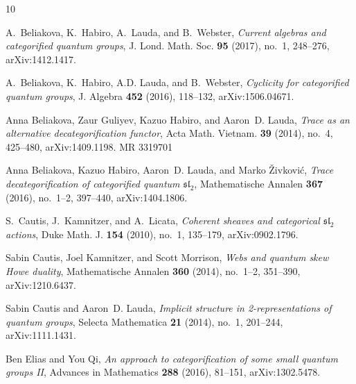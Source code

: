 \documentclass{amsart}
\numberwithin{equation}{section}
\theoremstyle{definition}
\begin{document}
\providecommand{\bysame}{\leavevmode\hbox to3em{\hrulefill}\thinspace}
\providecommand{\MR}{\relax\ifhmode\unskip\space\fi MR }
\providecommand{\MRhref}[2]{%
  \href{http://www.ams.org/mathscinet-getitem?mr=#1}{#2}
}
\providecommand{\href}[2]{#2}
\begin{thebibliography}{10}

A.~Beliakova, K.~Habiro, A.~Lauda, and B.~Webster, \emph{Current algebras and categorified quantum groups}, J. Lond. Math. Soc. \textbf{95} (2017), no.~1, 248--276, \href{https://arxiv.org/abs/1412.1417}{arXiv:1412.1417}.

A.~Beliakova, K.~Habiro, A.D. Lauda, and B.~Webster, \emph{Cyclicity for categorified quantum groups}, J. Algebra \textbf{452} (2016), 118--132, \href{http://arxiv.org/abs/arXiv:1506.04671}{arXiv:1506.04671}.

Anna Beliakova, Zaur Guliyev, Kazuo Habiro, and Aaron~D. Lauda, \emph{Trace as an alternative decategorification functor}, Acta Math. Vietnam. \textbf{39} (2014), no.~4, 425--480, \href{https://arxiv.org/abs/1409.1198}{arXiv:1409.1198}. \MR{3319701}

Anna Beliakova, Kazuo Habiro, Aaron~D. Lauda, and Marko Živković, \emph{Trace decategorification of categorified quantum {$\mathfrak {sl}_2$}}, Mathematische Annalen \textbf{367} (2016), no.~1–2, 397–440, \href{https://arxiv.org/abs/1404.1806}{arXiv:1404.1806}.

S.~Cautis, J.~Kamnitzer, and A.~Licata, \emph{Coherent sheaves and categorical {$\mathfrak{sl}_2$} actions}, Duke Math. J. \textbf{154} (2010), no.~1, 135--179, \href{https://arxiv.org/abs/0902.1796}{arXiv:0902.1796}.

Sabin Cautis, Joel Kamnitzer, and Scott Morrison, \emph{Webs and quantum skew {H}owe duality}, Mathematische Annalen \textbf{360} (2014), no.~1–2, 351–390, \href{https://arxiv.org/abs/1210.6437}{arXiv:1210.6437}.

Sabin Cautis and Aaron~D. Lauda, \emph{Implicit structure in 2-representations of quantum groups}, Selecta Mathematica \textbf{21} (2014), no.~1, 201–244, \href{https://arxiv.org/abs/1111.1431}{arXiv:1111.1431}.

Ben Elias and You Qi, \emph{An approach to categorification of some small quantum groups {II}}, Advances in Mathematics \textbf{288} (2016), 81–151, \href{https://arxiv.org/abs/1302.5478}{arXiv:1302.5478}.


\end{thebibliography}
\end{document}
